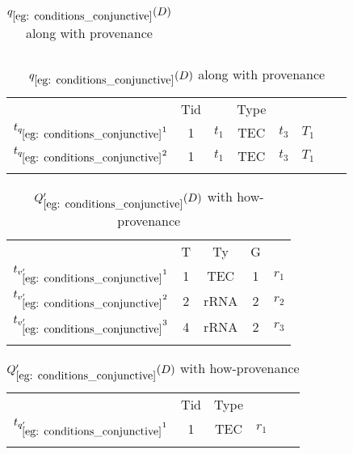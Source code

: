 \begin{example}
{\begin{table}[htp]
\begin{tabular}[t]{c|c|c|c|c|c|c|c|}
\end{tabular}
\small
\caption{$q_{\ref{eg: conditions_conjunctive}}(D)$ along with provenance}\label{Table: Instance of q9}
\begin{tabular}[t]{c|c|c|c|c|c|c|c|} \hhline{~-------}
&Tid&&Type&&\\ \hhline{~-------}
$t_{q_{\ref{eg: conditions_conjunctive}}1}$&1&$t_1$&TEC&$t_3$&$T_1$\\ \hhline{~-------}
$t_{q_{\ref{eg: conditions_conjunctive}}2}$&1&$t_1$&TEC&$t_3$&$T_1$\\ \hhline{~-------}
\end{tabular}
\end{table}
\begin{table}[htp]
\centering
\small
\caption{$V_{\ref{eg: conditions_conjunctive}}'(D)$ with how-provenance}\label{Table: Instance of v9}
\begin{tabular}[t]{c|c|c|c|c|} \hhline{~----}
&T&Ty&G&\\ \hhline{~----}
$t_{v_{\ref{eg: conditions_conjunctive}}'1}$&1&TEC&1&$r_1$\\ \hhline{~----}
$t_{v_{\ref{eg: conditions_conjunctive}}'2}$&2&rRNA&2&$r_2$\\ \hhline{~----}
$t_{v_{\ref{eg: conditions_conjunctive}}'3}$&4&rRNA&2&$r_3$\\ \hhline{~----}
\end{tabular}
\small
\caption{$Q_{\ref{eg: conditions_conjunctive}}'(D)$ with how-provenance}\label{Table: Instance of q9}
\begin{tabular}[t]{c|c|c|c|c|c|} \hhline{~-----}
&Tid&Type&\\ \hhline{~-----}
$t_{q_{\ref{eg: conditions_conjunctive}}'1}$&1&TEC&$r_1$\\ \hhline{~-----}
\end{tabular}
\end{table}
}



\end{example}
